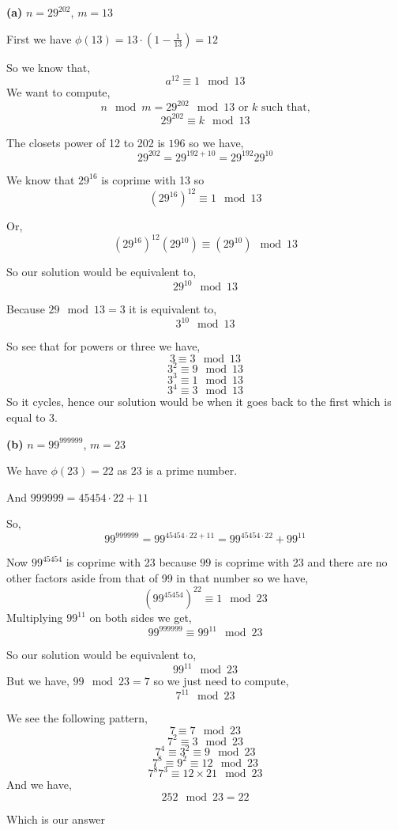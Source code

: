 \documentclass[12pt]{article}
\newcommand{\question}[3][Q]{
\begin{description}
\item \textbf{#1{#2}} #3
\end{description}
}
\begin{document}
\question[]{(a)}{
    $n = 29^{202}$, $m = 13$
}
\begin{answer}
    First we have $\phi(13) = 13 \cdot (1 - \frac{1}{13}) = 12$

    So we know that, 
    $$ a^{12} \equiv 1 \mod 13 $$ 
    We want to compute, 
    $$ n \mod m = 29^{202} \mod 13 \text{ or $k$ such that,} $$
    $$ 29^{202} \equiv k \mod 13 $$ 

    The closets power of 12 to 202 is $196$ so we have, 
    $$ 29^{202} = 29^{192 + 10} = 29^{192} 29^{10} $$ 


    We know that $29^{16}$ is coprime with 13 so 
    $$ (29^{16})^{12} \equiv 1 \mod 13 $$ 

    Or, 
    $$ (29^{16})^{12} (29^{10}) \equiv (29^{10}) \mod 13 $$ 

    So our solution would be equivalent to, 
    $$ 29^{10} \mod 13 $$ 

    Because $29 \mod 13 = 3$ it is equivalent to, 
    $$ 3^{10} \mod 13 $$ 

    So see that for powers or three we have, 
    $$ 3 \equiv 3 \mod 13 $$ 
    $$ 3^2 \equiv 9 \mod 13 $$ 
    $$ 3^{3} \equiv 1 \mod 13 $$ 
    $$ 3^{4} \equiv 3 \mod 13 $$ 
    So it cycles, hence our solution would be when it goes back to the first which is equal to $3$.

\end{answer}

\question[]{(b)}{
    $n = 99^{999999}$, $m = 23$
}
\begin{answer}
    We have $\phi(23) = 22$ as  $23$ is a prime number.

    And $999999 = 45454 \cdot 22 + 11$

    So, 
    $$ 99^{999999} = 99^{45454 \cdot 22 + 11} =  99^{45454 \cdot 22} + 99^{11}  $$

    Now $99^{45454}$ is coprime with 23 because $99$ is coprime with 23 and there are no other factors aside from that of 99 in that number so we have, 
    $$ (99^{45454})^{22} \equiv 1 \mod 23 $$ 
    Multiplying $99^{11}$ on both sides we get, 
    $$ 99^999999 \equiv 99^{11} \mod 23 $$ 


    So our solution would be equivalent to, 
    $$ 99^{11} \mod 23 $$ 
    But we have, $ 99 \mod 23 = 7$ so we just need to compute, 
    $$ 7^{11} \mod 23 $$ 

    We see the following pattern, 
    $$ 7 \equiv 7 \mod 23 $$ 
    $$ 7^2 \equiv 3 \mod 23 $$ 
    $$ 7^{4} \equiv 3^{2} \equiv 9 \mod 23 $$ 
    $$ 7^{8} \equiv 9^{2} \equiv 12 \mod 23 $$ 
    $$ 7^{8} 7^{3} \equiv 12 \times  21 \mod 23$$
    And we have, 
    $$ 252 \mod 23  = 22 $$ 

    Which is our answer
\end{answer}
\end{document}
